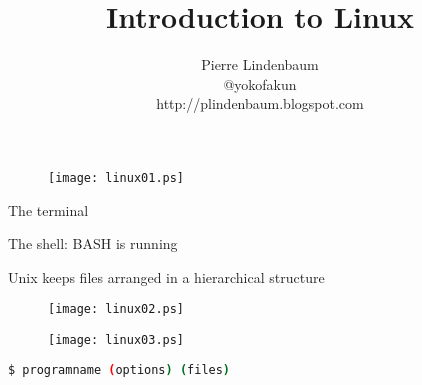 \documentclass{beamer}
\title{Introduction to Linux}
\author{Pierre Lindenbaum\\@yokofakun\\http://plindenbaum.blogspot.com}\institute{Institut du Thorax. Nantes. France}
\begin{document}
\begin{frame}
\titlepage
\end{frame}



\begin{frame}
\begin{figure}
\texttt{[image: linux01.ps]}
\end{figure}
\end{frame}

\begin{frame}[fragile]
 \begin{center}
    \huge{The terminal}\\
  \end{center}
\end{frame}

\begin{frame}[fragile]
 \begin{center}
    \huge{The shell: BASH is running}\\
  \end{center}
\end{frame}

\begin{frame}[fragile]
 \begin{center}
    \huge{Unix keeps files arranged in a hierarchical structure}\\
  \end{center}
\end{frame}


\begin{frame}
\begin{figure}
\texttt{[image: linux02.ps]}
\end{figure}
\end{frame}

\begin{frame}
\begin{figure}
\texttt{[image: linux03.ps]}
\end{figure}
\end{frame}


\begin{frame}[fragile]
\begin{lstlisting}[language=bash]
$ programname (options) (files)
\end{lstlisting}
\end{frame}
\end{document}
